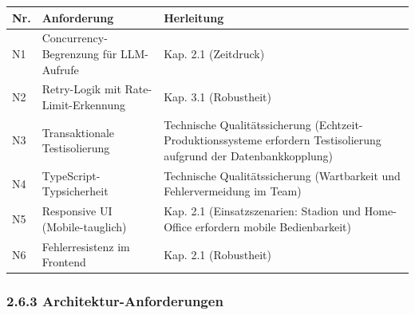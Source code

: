 {\def\LTcaptype{none} %
\begin{longtable}[]{@{}
  >{\raggedright\arraybackslash}p{}
  >{\raggedright\arraybackslash}p{}
  >{\raggedright\arraybackslash}p{}@{}}
\toprule\noalign{}
\begin{minipage}[b]{\linewidth}\raggedright
Nr.
\end{minipage} & \begin{minipage}[b]{\linewidth}\raggedright
Anforderung
\end{minipage} & \begin{minipage}[b]{\linewidth}\raggedright
Herleitung
\end{minipage} \\
\midrule\noalign{}
\endhead
\bottomrule\noalign{}
\endlastfoot
N1 & Concurrency-Begrenzung für LLM-Aufrufe & Kap. 2.1 (Zeitdruck) \\
N2 & Retry-Logik mit Rate-Limit-Erkennung & Kap. 3.1 (Robustheit) \\
N3 & Transaktionale Testisolierung & Technische Qualitätssicherung
(Echtzeit-Produktionssysteme erfordern Testisolierung aufgrund der
Datenbankkopplung) \\
N4 & TypeScript-Typsicherheit & Technische Qualitätssicherung
(Wartbarkeit und Fehlervermeidung im Team) \\
N5 & Responsive UI (Mobile-tauglich) & Kap. 2.1 (Einsatzszenarien:
Stadion und Home-Office erfordern mobile Bedienbarkeit) \\
N6 & Fehlerresistenz im Frontend & Kap. 2.1 (Robustheit) \\
\end{longtable}
}

\subsubsection{2.6.3
Architektur-Anforderungen}\label{architektur-anforderungen}

